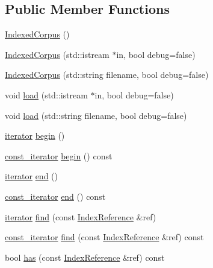 \subsection*{Public Member Functions}
\begin{DoxyCompactItemize}
\item 
\hyperlink{classIndexedCorpus_abed3d107618b4d1cc91f77c56445c5a5}{Indexed\+Corpus} ()
\item 
\hyperlink{classIndexedCorpus_a3a2369b02abd0c7f4eb25710a5aec446}{Indexed\+Corpus} (std\+::istream $\ast$in, bool debug=false)
\item 
\hyperlink{classIndexedCorpus_ab5d67abefdab495addd6bdfb976c4c0b}{Indexed\+Corpus} (std\+::string filename, bool debug=false)
\item 
void \hyperlink{classIndexedCorpus_af77786d6aba870b93e5cea36e25842c2}{load} (std\+::istream $\ast$in, bool debug=false)
\item 
void \hyperlink{classIndexedCorpus_a7b5292da7a8f674d83b6bc0dc5e6e3c8}{load} (std\+::string filename, bool debug=false)
\item 
\hyperlink{classIndexedCorpus_a08602ec2763d0bd068d2c3213edb8256}{iterator} \hyperlink{classIndexedCorpus_aa8be0b3a2a730fccd755a9e12b74f869}{begin} ()
\item 
\hyperlink{classIndexedCorpus_a0bb2b3e49bd81618fc39fd6d9d505531}{const\+\_\+iterator} \hyperlink{classIndexedCorpus_a6288ffdaa5fac4190672fa17b931cb20}{begin} () const 
\item 
\hyperlink{classIndexedCorpus_a08602ec2763d0bd068d2c3213edb8256}{iterator} \hyperlink{classIndexedCorpus_a9153a4018b224d89f49a5435dd795d8b}{end} ()
\item 
\hyperlink{classIndexedCorpus_a0bb2b3e49bd81618fc39fd6d9d505531}{const\+\_\+iterator} \hyperlink{classIndexedCorpus_a0ec504ca81277f6838f913163d76c99c}{end} () const 
\item 
\hyperlink{classIndexedCorpus_a08602ec2763d0bd068d2c3213edb8256}{iterator} \hyperlink{classIndexedCorpus_aae1ae54b38d7df66e9195441c0df18cd}{find} (const \hyperlink{classIndexReference}{Index\+Reference} \&ref)
\item 
\hyperlink{classIndexedCorpus_a0bb2b3e49bd81618fc39fd6d9d505531}{const\+\_\+iterator} \hyperlink{classIndexedCorpus_a7514fdb00499778a2606fc6e8e7dd8c7}{find} (const \hyperlink{classIndexReference}{Index\+Reference} \&ref) const 
\item 
bool \hyperlink{classIndexedCorpus_a51ac4a603352deb4937a4c75baa1944b}{has} (const \hyperlink{classIndexReference}{Index\+Reference} \&ref) const 

\end{DoxyCompactItemize}
